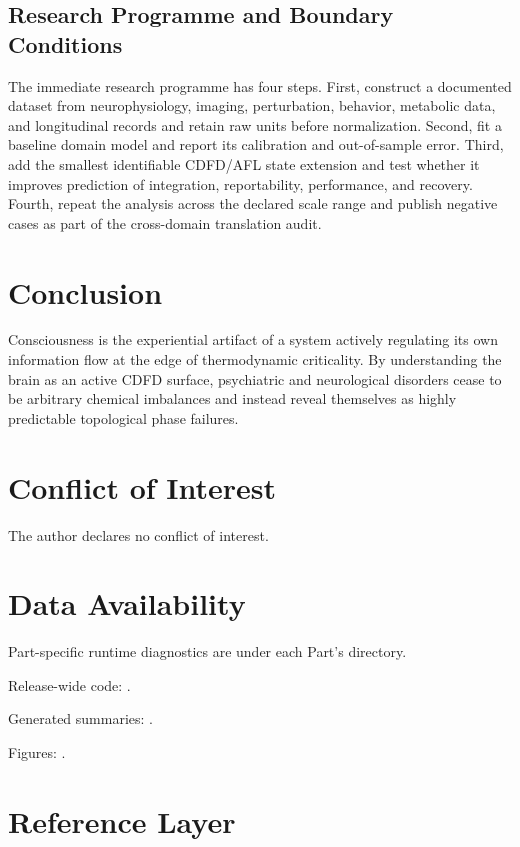 \documentclass[11pt,a4paper]{article}
\begin{document}
\subsection{Research Programme and Boundary Conditions}

The immediate research programme has four steps. First, construct a documented
dataset from neurophysiology, imaging, perturbation, behavior, metabolic data, and longitudinal records and retain raw units before normalization.
Second, fit a baseline domain model and report its calibration and out-of-sample
error. Third, add the smallest identifiable CDFD/AFL state extension and test
whether it improves prediction of integration, reportability, performance, and recovery. Fourth, repeat the
analysis across the declared scale range and publish negative cases as part of
the cross-domain translation audit.


\section{Conclusion}
Consciousness is the experiential artifact of a system actively regulating its own information flow at the edge of thermodynamic criticality. By understanding the brain as an active CDFD surface, psychiatric and neurological disorders cease to be arbitrary chemical imbalances and instead reveal themselves as highly predictable topological phase failures.
\section*{Conflict of Interest} The author declares no conflict of interest.
\section*{Data Availability}
Part-specific runtime diagnostics are under each Part's  directory.

Release-wide code: .

Generated summaries: .

Figures: .


\section{Reference Layer}


\end{document}
